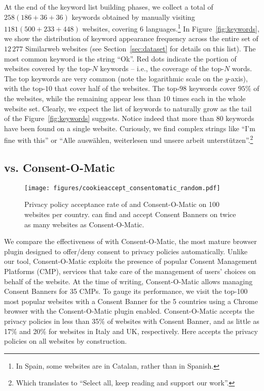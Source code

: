 At the end of the keyword list building phases, we collect a total of $258 (186+36+36)$ keywords obtained by manually visiting $1181 (500+233+448)$ websites, covering 6 languages.\footnote{In Spain, some websites are in Catalan, rather than in Spanish.} In Figure~\ref{fig:keywords}, we show the distribution of keyword appearance frequency across the entire set of $12\,277$ Similarweb websites (see Section~\ref{sec:dataset} for details on this list). The most common keyword is the string ``Ok''. Red dots indicate the portion of websites covered by the top-$N$ keywords -- i.e., the coverage of the top-$N$ words. The top keywords are very common (note the logarithmic scale on the $y$-axis), with the top-$10$ that cover half of the websites. The top-$98$ keywords cover $95\%$ of the websites, while the remaining appear less than $10$ times each in the whole website set. Clearly, we expect the list of keywords to naturally grow as the tail of the Figure~\ref{fig:keywords} suggests. Notice indeed that more than 80 keywords have been found on a single website. Curiously, we find complex strings like ``I'm fine with this'' or ``Alle auswählen, weiterlesen und unsere arbeit unterstützen''.\footnote{Which translates to ``Select all, keep reading and support our work''.}



\subsection{\TOOL vs. Consent-O-Matic}
\label{sec:ca_vs_com}

\begin{figure}[t]
    \centering
    \texttt{[image: figures/cookieaccept\_consentomatic\_random.pdf]}
    \caption{Privacy policy acceptance rate of \TOOL and Consent-O-Matic on 100 websites per country. \TOOL can find and accept Consent Banners on twice as many websites as Consent-O-Matic.}
    \label{fig:ca_vs_com}
\end{figure}

We compare the effectiveness of \TOOL with Consent-O-Matic, the most mature browser plugin designed to offer/deny consent to privacy policies automatically. Unlike our tool, Consent-O-Matic exploits the presence of popular Consent Management Platforms (CMP), services that take care of the management of users' choices on behalf of the website. At the time of writing, Consent-O-Matic allows managing Consent Banners for 35 CMPs. To gauge its performance, we visit the top-100 most popular websites with a Consent Banner for the 5 countries using a Chrome browser with the Consent-O-Matic plugin enabled. Consent-O-Matic accepts the privacy policies in less than 35\% of websites with Consent Banner, and as little as 17\% and 20\% for websites in Italy and UK, respectively. Here \TOOL accepts the privacy policies on all websites by construction.

